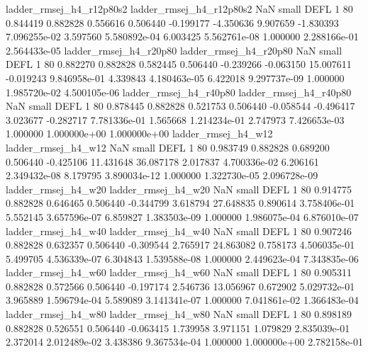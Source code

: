 ladder_rmsej_h4_r12p80s2 ladder_rmsej_h4_r12p80s2                   NaN      small     DEFL                 1 80 0.844419       0.882828 0.556616       0.506440   -0.199177     -4.350636      9.907659    -1.830393   7.096255e-02  3.597560 5.580892e-04     6.003425   5.562761e-08            1.000000    2.288166e-01        2.564433e-05
  ladder_rmsej_h4_r20p80   ladder_rmsej_h4_r20p80                   NaN      small     DEFL                 1 80 0.882270       0.882828 0.582445       0.506440   -0.239266     -0.063150     15.007611    -0.019243   9.846958e-01  4.339843 4.180463e-05     6.422018   9.297737e-09            1.000000    1.985720e-02        4.500105e-06
  ladder_rmsej_h4_r40p80   ladder_rmsej_h4_r40p80                   NaN      small     DEFL                 1 80 0.878445       0.882828 0.521753       0.506440   -0.058544     -0.496417      3.023677    -0.282717   7.781336e-01  1.565668 1.214234e-01     2.747973   7.426653e-03            1.000000    1.000000e+00        1.000000e+00
     ladder_rmsej_h4_w12      ladder_rmsej_h4_w12                   NaN      small     DEFL                 1 80 0.983749       0.882828 0.689200       0.506440   -0.425106     11.431648     36.087178     2.017837   4.700336e-02  6.206161 2.349432e-08     8.179795   3.890034e-12            1.000000    1.322730e-05        2.096728e-09
     ladder_rmsej_h4_w20      ladder_rmsej_h4_w20                   NaN      small     DEFL                 1 80 0.914775       0.882828 0.646465       0.506440   -0.344799      3.618794     27.648835     0.890614   3.758406e-01  5.552145 3.657596e-07     6.859827   1.383503e-09            1.000000    1.986075e-04        6.876010e-07
     ladder_rmsej_h4_w40      ladder_rmsej_h4_w40                   NaN      small     DEFL                 1 80 0.907246       0.882828 0.632357       0.506440   -0.309544      2.765917     24.863082     0.758173   4.506035e-01  5.499705 4.536339e-07     6.304843   1.539588e-08            1.000000    2.449623e-04        7.343835e-06
     ladder_rmsej_h4_w60      ladder_rmsej_h4_w60                   NaN      small     DEFL                 1 80 0.905311       0.882828 0.572566       0.506440   -0.197174      2.546736     13.056967     0.672902   5.029732e-01  3.965889 1.596794e-04     5.589089   3.141341e-07            1.000000    7.041861e-02        1.366483e-04
     ladder_rmsej_h4_w80      ladder_rmsej_h4_w80                   NaN      small     DEFL                 1 80 0.898189       0.882828 0.526551       0.506440   -0.063415      1.739958      3.971151     1.079829   2.835039e-01  2.372014 2.012489e-02     3.438386   9.367534e-04            1.000000    1.000000e+00        2.782158e-01
